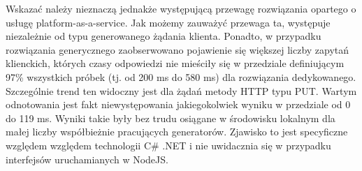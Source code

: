 Wskazać należy nieznaczą jednakże występującą przewagę rozwiązania opartego o usługę platform-as-a-service. Jak możemy zauważyć przewaga ta, występuje niezależnie od typu generowanego żądania klienta. Ponadto, w przypadku rozwiązania generycznego zaobserwowano pojawienie się większej liczby zapytań klienckich, których czasy odpowiedzi nie mieściły się w przedziale definiującym 97\% wszystkich próbek (tj. od 200 ms do 580 ms) dla rozwiązania dedykowanego. Szczególnie trend ten widoczny jest dla żądań metody HTTP typu PUT. Wartym odnotowania jest fakt niewystępowania jakiegokolwiek wyniku w przedziale od 0 do 119 ms. Wyniki takie były bez trudu osiągane w środowisku lokalnym dla małej liczby współbieżnie pracujących generatorów. Zjawisko to jest specyficzne względem względem technologii C\# .NET i nie uwidacznia się w przypadku interfejsów uruchamianych w NodeJS.

\clearpage

